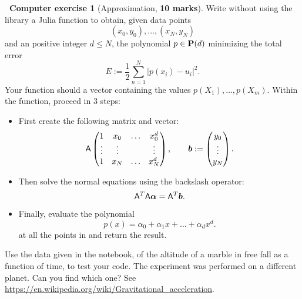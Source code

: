 \documentclass[11pt]{article}
\theoremstyle{definition}
\newtheorem{compexercise}{{\normalfont \faLaptop}~Computer exercise}
\renewcommand{\mymarks}[1]{\textbf{#1 marks}}
\begin{document}
\newpage
\begin{compexercise}
    [Approximation, \mymarks{10}]
    Write without using the  library a Julia function  to obtain,
    given data points
    \[
        (x_0, y_0), \dotsc, (x_N, y_N)
    \]
    and an positive integer $d \leq N$,
    the polynomial $p \in \mathbf P(d)$ minimizing the total error
    \[
        E := \frac{1}{2} \sum_{n=1}^{N} \bigl\lvert p(x_i) - u_i \bigr\rvert^2.
    \]
    Your function should a vector containing the values $p(X_1), \dotsc, p(X_m)$.
    Within the function, proceed in 3 steps:
    \begin{itemize}
        \item
            First create the following matrix and vector:
            \[
                \mathsf A
                \begin{pmatrix}
                    1 & x_0 & \hdots & x_0^d \\
                    \vdots & \vdots & & \vdots \\
                    1 & x_{N} & \hdots & x_N^d
                \end{pmatrix},
                \qquad
                \mathbf{\boldsymbol{b}} :=
                \begin{pmatrix}
                    y_0 \\
                    \vdots \\
                    y_N
                \end{pmatrix}.
            \]
            \item
                Then solve the normal equations using the backslash operator:
                \[
                    \mathsf A^T \mathsf A \mathbf{\boldsymbol{\alpha}} = \mathsf A^T \mathbf{\boldsymbol{b}}.
                \]

            \item
                Finally, evaluate the polynomial
                \[
                    p(x) = \alpha_0 + \alpha_1 x + \dotsc + \alpha_d x^d.
                \]
                at all the points in  and return the result.
    \end{itemize}
    Use the data given in the notebook,
    of the altitude of a marble in free fall as a function of time,
    to test your code.
    The experiment was performed on a different planet.
    Can you find which one?
    See \url{https://en.wikipedia.org/wiki/Gravitational_acceleration}.
\end{compexercise}
\end{document}
